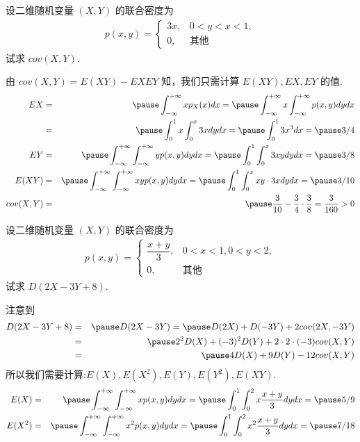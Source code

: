 \documentclass[Prob-All.tex]{subfiles}
\begin{document}
\begin{frame}
	\vspace{0.3cm}
	\begin{exam}
		设二维随机变量 $(X,Y)$ 的联合密度为
		\begin{eqnarray*}
			p(x,y)=\left\{
			\begin{array}{ll}
				3x, & 0<y<x<1,\\
				0, &\mbox{其他}
			\end{array}
			\right.
		\end{eqnarray*}
		试求 $cov (X,Y)$.
	\end{exam}

	\pause \jieda  由 $cov (X,Y)=E (XY)-EXEY$ 知，我们只需计算 $E (XY), EX, EY$ 的值.
	\begin{eqnarray*}
		EX&=&\pause \int_{-\infty}^{+\infty}xp_X(x)dx=\pause \int_{-\infty}^{+\infty}x\int_{-\infty}^{+\infty}p(x,y)dydx\\
		&=&\pause \int_0^1x\int_0^x3xdydx=\pause \int_0^13x^3dx=\pause 3/4\\
		EY&=&\pause \int_{-\infty}^{+\infty}\int_{-\infty}^{+\infty}yp(x,y)dydx=\pause \int_0^1\int_0^x3xydydx=\pause 3/8\\
		E(XY)&=&\pause \int_{-\infty}^{+\infty}\int_{-\infty}^{+\infty}xyp(x,y)dydx=\pause \int_0^1\int_0^xxy\cdot 3xdydx=\pause 3/10\\
		cov(X,Y)&=&\pause \dfrac{3}{10}-\dfrac{3}{4}\cdot \dfrac{3}{8}=\dfrac{3}{160}>0
	\end{eqnarray*}

\end{frame}
\begin{frame}
	\vspace{0.3cm}
	\begin{exam}
		设二维随机变量 $(X,Y)$ 的联合密度为
		\begin{eqnarray*}
			p(x,y)=\left\{
			\begin{array}{ll}
				\dfrac{x+y}{3}, & 0<x<1, 0<y<2,\\
				0, &\mbox{其他}
			\end{array}
			\right.
		\end{eqnarray*}
		试求 $D (2X-3Y+8)$.
	\end{exam}

	\pause
	\jieda 注意到
	\begin{eqnarray*}
		D(2X-3Y+8)&=&\pause D(2X-3Y)= \pause D(2X)+D(-3Y)+2cov(2X,-3Y)\\
		&=&\pause 2^2D(X)+(-3)^2D(Y)+2\cdot2\cdot (-3)cov(X,Y)\\
		&=&\pause 4D(X)+9D(Y)-12cov(X,Y)
	\end{eqnarray*}
	\pause 所以我们需要计算:$E (X),E (X^2), E (Y), E (Y^2), E (XY)$.
	\pause
	\begin{eqnarray*}
		E(X)&=&\pause \int_{-\infty}^{+\infty}\int_{-\infty}^{+\infty}xp(x,y)dydx=\pause \int_0^1\int_0^2x\dfrac{x+y}{3}dydx=\pause 5/9\\
		E(X^2)&=&\pause \int_{-\infty}^{+\infty}\int_{-\infty}^{+\infty}x^2p(x,y)dydx=\pause \int_0^1\int_0^2x^2\dfrac{x+y}{3}dydx=\pause 7/18\\
	\end{eqnarray*}

\end{frame}
\end{document}
